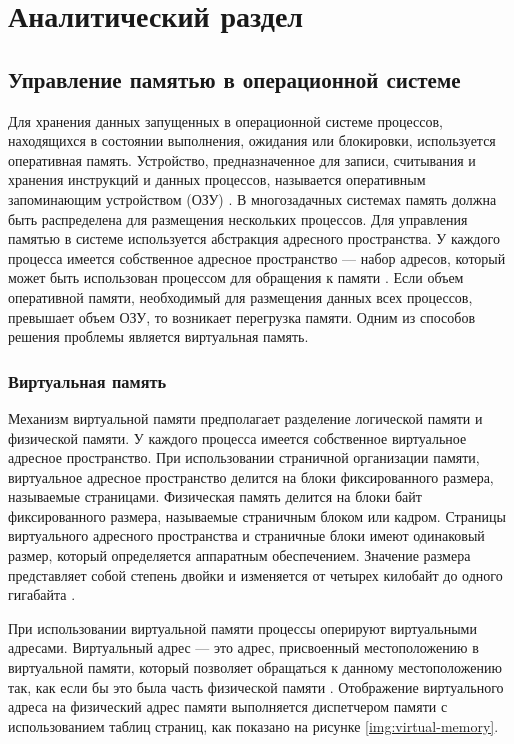 \chapter{Аналитический раздел}

\section{Управление памятью в операционной системе}

Для хранения данных запущенных в операционной системе процессов, находящихся в состоянии выполнения, ожидания или блокировки, используется оперативная память. Устройство, предназначенное для записи, считывания и хранения инструкций и данных процессов, называется оперативным запоминающим устройством (ОЗУ) \cite{ram}. В многозадачных системах память должна быть распределена для размещения нескольких процессов. Для управления памятью в системе используется абстракция адресного пространства. У каждого процесса имеется собственное адресное пространство --- набор адресов, который может быть использован процессом для обращения к памяти \cite{address-space}. Если объем оперативной памяти, необходимый для размещения данных всех процессов, превышает объем ОЗУ, то возникает перегрузка памяти. Одним из способов решения проблемы является виртуальная память.

\subsection{Виртуальная память}

Механизм виртуальной памяти предполагает разделение логической памяти и физической памяти. У каждого процесса имеется собственное виртуальное адресное пространство. При использовании страничной организации памяти, виртуальное адресное пространство делится на блоки фиксированного размера, называемые страницами. Физическая память делится на блоки байт фиксированного размера, называемые страничным блоком или кадром. Страницы виртуального адресного пространства и страничные блоки имеют одинаковый размер, который определяется аппаратным обеспечением. Значение размера представляет собой степень двойки и изменяется от четырех килобайт до одного гигабайта \cite{swapping}.

При использовании виртуальной памяти процессы оперируют виртуальными адресами. Виртуальный адрес --- это адрес, присвоенный местоположению в виртуальной памяти, который позволяет обращаться к данному местоположению так, как если бы это была часть физической памяти \cite{address-space}. Отображение виртуального адреса на физический адрес памяти выполняется диспетчером памяти с использованием таблиц страниц, как показано на рисунке \ref{img:virtual-memory}.

